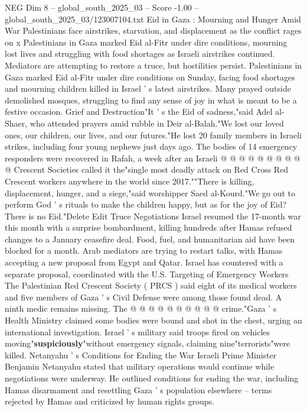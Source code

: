 \begin{textsample}{NEG Dim 8 – global\_south\_2025\_03 – Score -1.00 – global\_south\_2025\_03/123007104.txt}  \label{ex:f8_neg_075}
Eid in Gaza : Mourning and Hunger Amid War Palestinians face airstrikes, starvation, and displacement as the conflict rages on x Palestinians in Gaza marked Eid al-Fitr under dire conditions, mourning lost lives and struggling with food shortages as Israeli airstrikes continued.
Mediators are attempting to restore a truce, but hostilities persist.
Palestinians in Gaza marked Eid al-Fitr under dire conditions on Sunday, facing food shortages and mourning children killed in Israel ' s latest airstrikes.
Many prayed outside demolished mosques, struggling to find any sense of joy in what is meant to be a festive occasion.
Grief and Destruction"It ' s the Eid of sadness,"said Adel al-Shaer, who attended prayers amid rubble in Deir al-Balah."We lost our loved ones, our children, our lives, and our futures."He lost 20 family members in Israeli strikes, including four young nephews just days ago.
The bodies of 14 emergency responders were recovered in Rafah, a week after an Israeli @ @ @ @ @ @ @ @ @ @ Crescent Societies called it the"single most deadly attack on Red Cross Red Crescent workers anywhere in the world since 2017.""There is killing, displacement, hunger, and a siege,"said worshipper Saed al-Kourd."We go out to perform God ' s rituals to make the children happy, but as for the joy of Eid?
There is no Eid."Delete Edit Truce Negotiations Israel resumed the 17-month war this month with a surprise bombardment, killing hundreds after Hamas refused changes to a January ceasefire deal.
Food, fuel, and humanitarian aid have been blocked for a month.
Arab mediators are trying to restart talks, with Hamas accepting a new proposal from Egypt and Qatar.
Israel has countered with a separate proposal, coordinated with the U.S.
Targeting of Emergency Workers The Palestinian Red Crescent Society ( PRCS ) said eight of its medical workers and five members of Gaza ' s Civil Defense were among those found dead.
A ninth medic remains missing.
The @ @ @ @ @ @ @ @ @ @ crime."Gaza ' s Health Ministry claimed some bodies were bound and shot in the chest, urging an international investigation.
Israel ' s military said troops fired on vehicles moving"\textbf{suspiciously}"without emergency signals, claiming nine"terrorists"were killed.
Netanyahu ' s Conditions for Ending the War Israeli Prime Minister Benjamin Netanyahu stated that military operations would continue while negotiations were underway.
He outlined conditions for ending the war, including Hamas disarmament and resettling Gaza ' s population elsewhere -- terms rejected by Hamas and criticized by human rights groups.

\end{textsample}
